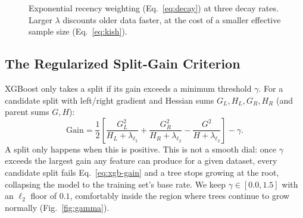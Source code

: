 \documentclass[conference]{IEEEtran}
\begin{document}
\begin{figure}[!t]
\centering
{}
\caption{Exponential recency weighting (Eq.~\ref{eq:decay}) at three
decay rates. Larger $\lambda$ discounts older data faster, at the cost
of a smaller effective sample size (Eq.~\ref{eq:kish}).}
\label{fig:decay}
\end{figure}

\subsection{The Regularized Split-Gain Criterion}
\label{sec:gamma-math}

XGBoost only takes a split if its gain exceeds a minimum threshold
$\gamma$. For a candidate split with left/right gradient and Hessian
sums $G_L, H_L, G_R, H_R$ (and parent sums $G, H$):
\begin{equation}
  \text{Gain} = \frac{1}{2}\left[\frac{G_L^2}{H_L+\lambda_{\ell_2}} +
  \frac{G_R^2}{H_R+\lambda_{\ell_2}} -
  \frac{G^2}{H+\lambda_{\ell_2}}\right] - \gamma.
\label{eq:xgb-gain}
\end{equation}
A split only happens when this is positive. This is not a smooth
dial: once $\gamma$ exceeds the largest gain any feature can produce
for a given dataset, every candidate split fails
Eq.~\eqref{eq:xgb-gain} and a tree stops growing at the root,
collapsing the model to the training set's base rate. We keep
$\gamma \in [0.0, 1.5]$ with an $\ell_2$ floor of $0.1$, comfortably
inside the region where trees continue to grow normally
(Fig.~\ref{fig:gamma}).
\end{document}
